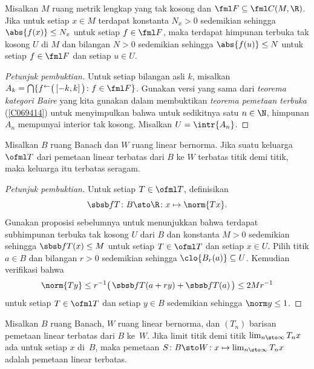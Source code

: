 \begin{prop}\label{C070117} Misalkan $M$ ruang metrik lengkap yang tak kosong dan $\fml F \subseteq \fml C(M,\R)$.
Jika untuk setiap $x \in M$ terdapat konstanta $N_x > 0$ sedemikian sehingga $\abs{f(x)} \le N_x$ untuk
setiap $f \in \fml F$, maka terdapat himpunan terbuka tak kosong $U$ di $M$ dan bilangan $N > 0$ sedemikian
sehingga $\abs{f(u)} \le N$ untuk setiap $f \in \fml F$ dan setiap $u \in U$.
\end{prop}

\begin{proof}[\emph{Petunjuk pembuktian}] Untuk setiap bilangan asli $k$, misalkan $A_k =
\bigcap\{f^{\gets}\bigl(\,[-k,k]\,\bigr)\colon f \in \fml F\}$. Gunakan versi yang sama dari
\emph{teorema kategori Baire} yang kita gunakan dalam membuktikan \emph{teorema pemetaan terbuka} (\ref{C069414})
untuk menyimpulkan bahwa untuk sedikitnya satu $n \in \N$, himpunan $A_n$ mempunyai interior
tak kosong. Misalkan $U = \intr{A_n}$.   \ns
\end{proof}

\begin{thm}\label{thm_PUB} Misalkan $B$ ruang Banach dan $W$ ruang linear bernorma.
Jika suatu keluarga $\ofml T$ dari pemetaan linear terbatas dari $B$ ke $W$ terbatas titik demi
titik, maka keluarga itu terbatas seragam.
\end{thm}

\begin{proof}[\emph{Petunjuk pembuktian}] Untuk setiap $T \in \ofml T$, definisikan
  \[ \sbsb fT\colon B \sto \R\colon x \mapsto \norm{Tx}. \]
Gunakan proposisi sebelumnya untuk menunjukkan bahwa terdapat subhimpunan terbuka tak kosong $U$ dari $B$
dan konstanta $M > 0$ sedemikian sehingga $\sbsb fT(x) \le M$ untuk setiap $T \in \ofml T$ dan setiap
$x \in U$. Pilih titik $a \in B$ dan bilangan $r > 0$ sedemikian sehingga $\clo{B_r(a)} \subseteq
U$. Kemudian verifikasi bahwa
  \[ \norm{Ty} \le r^{-1}\bigl(\, \sbsb fT(a + ry) + \sbsb fT(a)\,\bigr) \le 2Mr^{-1} \]
untuk setiap $T \in \ofml T$ dan setiap $y \in B$ sedemikian sehingga $\norm y \le 1$. \ns
\end{proof}

\begin{thm} Misalkan $B$ ruang Banach, $W$ ruang linear bernorma,
dan $(T_n)$ barisan pemetaan linear terbatas dari $B$ ke~$W$. Jika limit titik demi titik
$\lim_{n \sto \infty} T_nx$ ada untuk setiap $x$ di~$B$, maka pemetaan $S\colon B \sto
W\colon x \mapsto \lim_{n \sto \infty} T_nx$ adalah pemetaan linear terbatas.
\end{thm}

